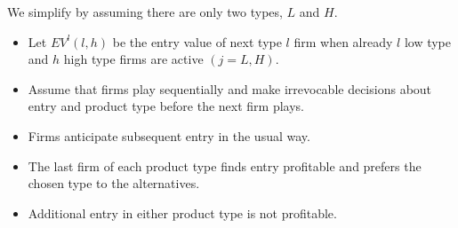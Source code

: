 \begin{frame}%


We simplify by assuming there are only two types, $L$ and $H$.

\begin{itemize}
\item Let $EV^{l}(l,h)$ be the entry value of next type $l$ firm when
already $l$ low type and $h$ high type firms are active $(j=L,H)$.

\item Assume that firms play sequentially and make irrevocable decisions
about entry and product type before the next firm plays.

\item Firms anticipate subsequent entry in the usual way.

\item The last firm of each product type finds entry profitable and prefers
the chosen type to the alternatives.

\item Additional entry in either product type is not profitable.
\end{itemize}

\end{frame}%

